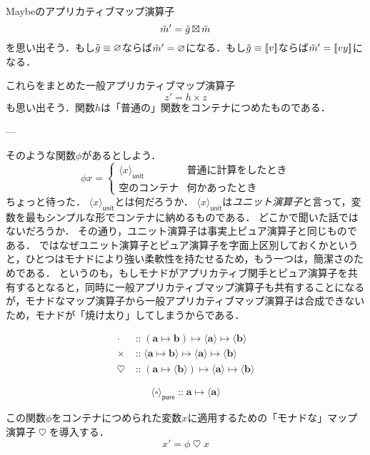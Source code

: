 \documentclass[twocolumn]{jsbook}
\def\[{[\![}
\def\]{]\!]}
\newcommand{\keyword}[1]{{\emph{#1}}}
\newcommand{\hsklType}[1]{\textbf{#1}}
\DeclareMathOperator{\hsklApplicativeMap}{\times}
\DeclareMathOperator{\hsklApplicativeMaybeMap}{\boxtimes}
\DeclareMathOperator{\hsklFmap}{\cdot}
\DeclareMathOperator{\hsklMonadMap}{\heartsuit}
\newcommand{\hsklNothing}{\varnothing}
\newcommand{\hsklJust}[1]{\[#1\]}
\newcommand{\hsklMaybe}[1]{\Tilde{#1}}
\newcommand{\hsklPure}[1]{\langle#1\rangle_\textsf{pure}}
\newcommand{\hsklUnit}[1]{\langle#1\rangle_\textsf{unit}}
\DeclareMathOperator{\mathIn}{::}
\DeclareMathOperator{\mathMapsTo}{\mapsto}
\newcommand{\mathSomething}{\square}
\newcommand{\mathMorph}[2]{#1\mathMapsTo#2}
\newcommand{\mathMorphII}[3]{#1\mathMapsTo#2\mathMapsTo#3}
\begin{document}
Maybeのアプリカティブマップ演算子$$\hsklMaybe{m}'=\hsklMaybe{g}\hsklApplicativeMaybeMap\hsklMaybe{m}$$を思い出そう．もし$\hsklMaybe{g}\equiv\hsklNothing$ならば$\hsklMaybe{m}'=\hsklNothing$になる．もし$\hsklMaybe{g}\equiv\hsklJust{v}$ならば$\hsklMaybe{m}'=\hsklJust{vy}$になる．

これらをまとめた一般アプリカティブマップ演算子$$z'=h\hsklApplicativeMap z$$も思い出そう．関数$h$は「普通の」関数をコンテナにつめたものである．


---

そのような関数$\phi$があるとしよう．
$$\phi x=\begin{cases}\hsklUnit{x}&\text{普通に計算をしたとき}\\
\text{空のコンテナ}&\text{何かあったとき}\end{cases}$$
ちょっと待った．
$\hsklUnit{x}$とは何だろうか．
$\hsklUnit{x}$は\keyword{ユニット演算子}と言って，変数を最もシンプルな形でコンテナに納めるものである．
どこかで聞いた話ではないだろうか．
その通り，ユニット演算子は事実上ピュア演算子と同じものである．
ではなぜユニット演算子とピュア演算子を字面上区別しておくかというと，ひとつはモナドにより強い柔軟性を持たせるため，もう一つは，簡潔さのためである．
というのも，もしモナドがアプリカティブ関手とピュア演算子を共有するとなると，同時に一般アプリカティブマップ演算子も共有することになるが，モナドなマップ演算子から一般アプリカティブマップ演算子は合成できないため，モナドが「焼け太り」してしまうからである．

\begin{align*}
\hsklFmap&\mathIn{}\mathMorphII{(\mathMorph{\hsklType{a}}{\hsklType{b}})}{\langle\hsklType{a}\rangle}{\langle\hsklType{b}
\rangle}\\
\hsklApplicativeMap&\mathIn{}\mathMorphII{\langle\mathMorph{\hsklType{a}}{\hsklType{b}}\rangle}{\langle\hsklType{a}\rangle}{\langle\hsklType{b}\rangle}\\
\hsklMonadMap&\mathIn{}\mathMorphII{(\mathMorph{\hsklType{a}}{\langle\hsklType{b}\rangle})}{\langle\hsklType{a}\rangle}{\langle{\hsklType{b}}\rangle}
\end{align*}

$$\hsklPure{\mathSomething}\mathIn\mathMorph{\hsklType{a}}{\langle\hsklType{a}\rangle}$$

この関数$\phi$をコンテナにつめられた変数$x$に適用するための「モナドな」マップ演算子$\hsklMonadMap$を導入する．
$$x'=\phi\hsklMonadMap x$$
\end{document}
